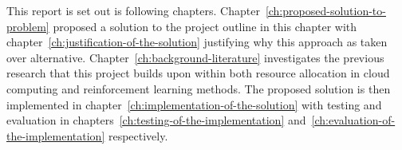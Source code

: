 This report is set out is following chapters. Chapter~\ref{ch:proposed-solution-to-problem} proposed a solution
to the project outline in this chapter with chapter~\ref{ch:justification-of-the-solution} justifying why this
approach as taken over alternative. Chapter~\ref{ch:background-literature} investigates the previous research
that this project builds upon within both resource allocation in cloud computing and reinforcement learning methods.
The proposed solution is then implemented in chapter~\ref{ch:implementation-of-the-solution} with testing and
evaluation in chapters~\ref{ch:testing-of-the-implementation} and~\ref{ch:evaluation-of-the-implementation} respectively.

%
%
%
